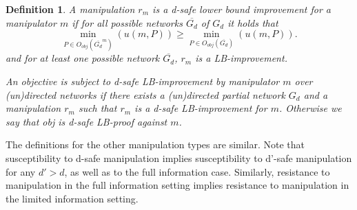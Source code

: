 \documentclass{article}
\newtheorem{definition}{Definition}
\begin{document}
\begin{definition}
A manipulation $r_m$ is a \emph{d-safe lower bound improvement} for a manipulator $m$ if for all possible networks $\overline{G_d}$ of $G_d$ it holds that
\[
\underset{P\in O_{obj}(\overline{G_d}^m)}{\min}(u(m,P))\geq\underset{P\in O_{obj}(\overline{G_d})}{\min}(u(m,P)).
\]
and for at least one possible network $\overline{G_d}$, $r_m$ is a LB-improvement.





An objective is \emph{subject to d-safe LB-improvement} by manipulator $m$ over (un)directed networks if there exists a (un)directed partial network $G_d$ and a manipulation $r_m$ such that $r_m$ is a d-safe LB-improvement for $m$. Otherwise we say that \emph{obj} is \emph{d-safe LB-proof} against $m$.
\end{definition}
\noindent
The definitions for the other manipulation types are similar. Note that susceptibility to d-safe manipulation implies susceptibility to d'-safe manipulation for any $d'>d$, as well as to the full information case. Similarly, resistance to manipulation in the full information setting implies resistance to manipulation in the limited information setting.
\end{document}
